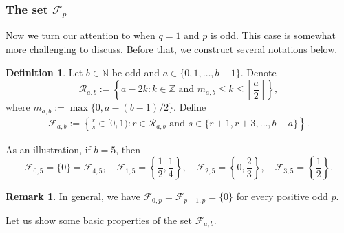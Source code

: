 \documentclass[12pt, reqno]{amsart}
\theoremstyle{plain}
\theoremstyle{definition}
\newtheorem{definition}[theorem]{Definition}
\newtheorem{remark}[theorem]{Remark}
\begin{document}
\subsubsection{The set $\mathcal{F}_p$}

Now we turn our attention to when $q=1$ and $p$ is odd. This case is somewhat more challenging to discuss. Before that, we construct several notations below.


\begin{definition}
    Let $b\in\mathbb{N}$ be odd and $a\in\{0, 1, \ldots, b-1\}$. Denote
    \[\mathcal{R}_{a, b}:=\left\{a-2k : k\in\mathbb{Z} \text{ and } m_{a, b}\le k\le\left\lfloor\frac{a}{2}\right\rfloor\right\},\]
    where $m_{a, b}:=\max\{0, a-(b-1)/2\}$.
    Define
    \begin{align*}
        \mathcal{F}_{a, b}:=\left\{\frac{r}{s}\in[0, 1) : r\in \mathcal{R}_{a, b}\text{ and } s\in\{r+1, r+3, \ldots, b-a\}\right\}.
    \end{align*}
\end{definition}

\noindent
As an illustration, if $b=5$, then
\[\mathcal{F}_{0,5}=\{0\}=\mathcal{F}_{4,5},\quad \mathcal{F}_{1,5}=\left\{\frac{1}{2},\frac{1}{4}\right\},\quad\mathcal{F}_{2,5}=\left\{0,\frac{2}{3}\right\},\quad\mathcal{F}_{3,5}=\left\{\frac{1}{2}\right\}.\]

\begin{remark}
    In general, we have $\mathcal{F}_{0, p}=\mathcal{F}_{p-1, p}=\{0\}$ for every positive odd $p$.
\end{remark}

Let us show some basic properties of the set $\mathcal{F}_{a, b}$.
\end{document}
